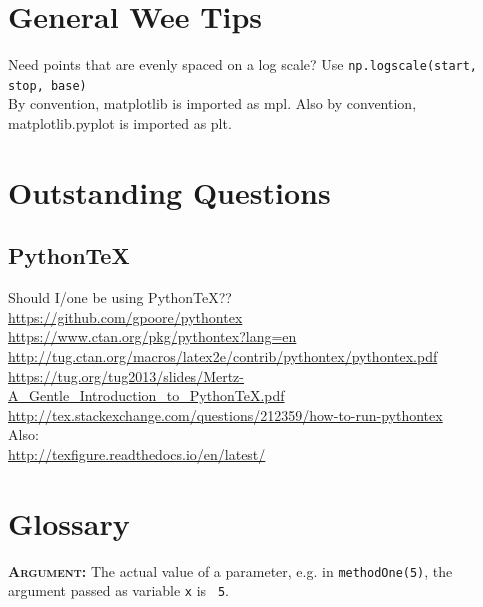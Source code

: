 \documentclass[11pt,a4paper]{article}
\begin{document}
 
\newpage
\section{General Wee Tips}
Need points that are evenly spaced on a log scale? Use {\tt np.logscale(start, stop, base)} \\
By convention, matplotlib is imported as mpl. Also by convention, matplotlib.pyplot is imported as plt.\\


\newpage
\section{Outstanding Questions}

    \subsection{PythonTeX} 
    Should I/one be using PythonTeX??\\
    \href{https://github.com/gpoore/pythontex}{https://github.com/gpoore/pythontex}\\
    \href{https://www.ctan.org/pkg/pythontex?lang=en}{https://www.ctan.org/pkg/pythontex?lang=en}\\
    \href{http://tug.ctan.org/macros/latex2e/contrib/pythontex/pythontex.pdf}{http://tug.ctan.org/macros/latex2e/contrib/pythontex/pythontex.pdf}\\
    \href{https://tug.org/tug2013/slides/Mertz-A\_Gentle\_Introduction\_to\_PythonTeX.pdf}{https://tug.org/tug2013/slides/Mertz-A\_Gentle\_Introduction\_to\_PythonTeX.pdf}\\
    \href{http://tex.stackexchange.com/questions/212359/how-to-run-pythontex}{http://tex.stackexchange.com/questions/212359/how-to-run-pythontex}\\

\noindent
Also: \\
\href{http://texfigure.readthedocs.io/en/latest/}{http://texfigure.readthedocs.io/en/latest/}\\



\newpage
\section{Glossary}

\smallskip \smallskip
\noindent
\textbf{\textsc{Argument:}} The actual value of a parameter, e.g. in
{\tt methodOne(5)}, the argument passed as variable {\tt x} is {\tt
5}.
\end{document}
